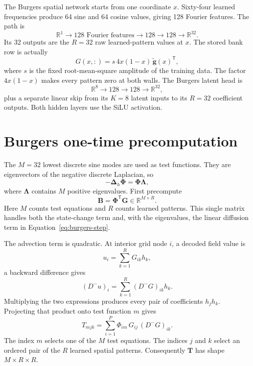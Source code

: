 \documentclass[11pt]{article}
\newcommand{\mat}[1]{\mathbf{#1}}
\newcommand{\vect}[1]{\mathbf{#1}}
\begin{document}
The Burgers spatial network starts from one coordinate $x$.  Sixty-four
learned frequencies produce 64 sine and 64 cosine values, giving 128 Fourier
features.  The path is
\begin{equation}
  \mathbb{R}^{1}
  \longrightarrow128\text{ Fourier features}
  \longrightarrow128
  \longrightarrow128
  \longrightarrow\mathbb{R}^{32}.
\end{equation}
Its 32 outputs are the $R=32$ raw learned-pattern values at $x$.  The stored
bank row is actually
\begin{equation}
  G(x,:)=s\,4x(1-x)\,\widetilde{\vect{g}}(x)^{\mathsf T},
\end{equation}
where $s$ is the fixed root-mean-square amplitude of the training data.
The factor $4x(1-x)$ makes every pattern zero at both walls.  The Burgers
latent head is
\begin{equation}
  \mathbb{R}^{8}\longrightarrow128\longrightarrow128
  \longrightarrow\mathbb{R}^{32},
\end{equation}
plus a separate linear skip from its $K=8$ latent inputs to its $R=32$
coefficient outputs.  Both hidden layers use the SiLU activation.

\section{Burgers one-time precomputation}

The $M=32$ lowest discrete sine modes are used as test functions.  They are
eigenvectors of the negative discrete Laplacian, so
\begin{equation}
  -\mat{\Delta}_h\mat{\Phi}=\mat{\Phi}\mat{\Lambda},
\end{equation}
where $\mat{\Lambda}$ contains $M$ positive eigenvalues.  First precompute
\begin{equation}
  \mat{B}=\mat{\Phi}^{\mathsf T}\mat{G}
  \in\mathbb{R}^{M\times R}.
\end{equation}
Here $M$ counts test equations and $R$ counts learned patterns.  This single
matrix handles both the state-change term and, with the eigenvalues, the
linear diffusion term in Equation~\eqref{eq:burgers-step}.

The advection term is quadratic.  At interior grid node $i$, a decoded field
value is
\begin{equation}
  u_i=\sum_{k=1}^{R}G_{ik}h_k,
\end{equation}
a backward difference gives
\begin{equation}
  (D^-u)_i=\sum_{k=1}^{R}(D^-G)_{ik}h_k.
\end{equation}
Multiplying the two expressions produces every pair of coefficients
$h_jh_k$.  Projecting that product onto test function $m$ gives
\begin{equation}
  T_{mjk}
  =\sum_{i=1}^{P}\Phi_{im}\,G_{ij}\,(D^-G)_{ik}.
  \label{eq:T-burgers}
\end{equation}
The index $m$ selects one of the $M$ test equations.  The indices $j$ and $k$
select an ordered pair of the $R$ learned spatial patterns.  Consequently
$\mat{T}$ has shape $M\times R\times R$.
\end{document}
